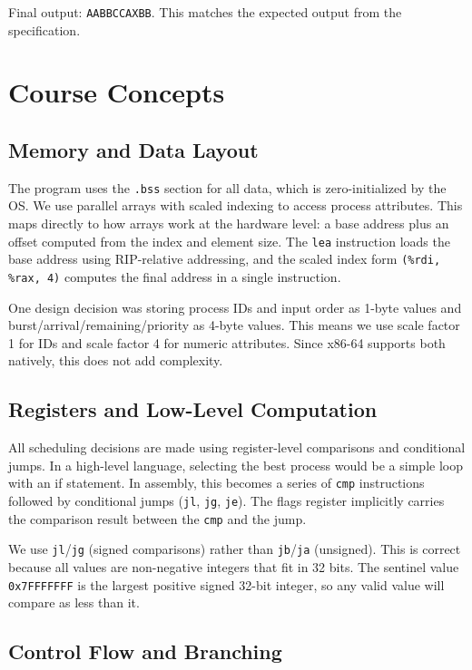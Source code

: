 \documentclass[a4paper,12pt]{article}
\begin{document}
Final output: \texttt{AABBCCAXBB}. This matches the expected output from the specification.

\section{Course Concepts}

\subsection{Memory and Data Layout}

The program uses the \texttt{.bss} section for all data, which is zero-initialized by the OS. We use parallel arrays with scaled indexing to access process attributes. This maps directly to how arrays work at the hardware level: a base address plus an offset computed from the index and element size. The \texttt{lea} instruction loads the base address using RIP-relative addressing, and the scaled index form \texttt{(\%rdi, \%rax, 4)} computes the final address in a single instruction.

One design decision was storing process IDs and input order as 1-byte values and burst/arrival/remaining/priority as 4-byte values. This means we use scale factor 1 for IDs and scale factor 4 for numeric attributes. Since x86-64 supports both natively, this does not add complexity.

\subsection{Registers and Low-Level Computation}

All scheduling decisions are made using register-level comparisons and conditional jumps. In a high-level language, selecting the best process would be a simple loop with an if statement. In assembly, this becomes a series of \texttt{cmp} instructions followed by conditional jumps (\texttt{jl}, \texttt{jg}, \texttt{je}). The flags register implicitly carries the comparison result between the \texttt{cmp} and the jump.

We use \texttt{jl}/\texttt{jg} (signed comparisons) rather than \texttt{jb}/\texttt{ja} (unsigned). This is correct because all values are non-negative integers that fit in 32 bits. The sentinel value \texttt{0x7FFFFFFF} is the largest positive signed 32-bit integer, so any valid value will compare as less than it.

\subsection{Control Flow and Branching}
\end{document}
